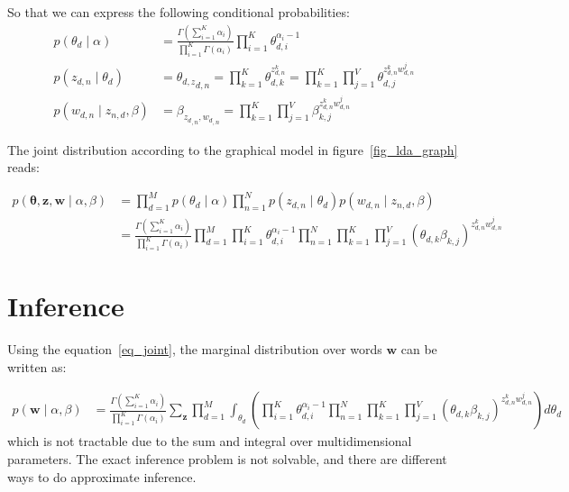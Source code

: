 \documentclass[12pt,a4paper,onecolumn]{article}
\begin{document}
\begin{multicols}{2}
	So that we can express the following conditional probabilities:
	\begin{align*}
		p(\theta_d \mid \alpha)        & = \frac{\Gamma\left(\sum_{i=1}^K \alpha_i\right)}{\prod_{i=1}^K\Gamma(\alpha_i)}\prod_{i=1}^K \theta_{d,i}^{\alpha_i -1}
		\\
		p(z_{d,n} \mid \theta_d)       & = {\theta_{d,z}}_{d,n} = \prod_{k=1}^K \theta_{d,k}^{z_{d,n}^k} =\prod_{k=1}^K \prod_{j=1}^V \theta_{d,j}^{z_{d,n}^k  w_{d,n}^j} \\
		p(w_{d,n} \mid z_{n,d}, \beta) & = \beta_{{z_d}_{,n},{w_d}_{,n}} = \prod_{k=1}^K \prod_{j=1}^V \beta_{k,j}^{z_{d,n}^k  w_{d,n}^j}
	\end{align*}



\end{multicols}

The joint distribution according to the graphical model in figure~\ref{fig_lda_graph} reads:

\begin{align}
	p(\bm{\theta}, \bm{z}, \bm{w} \mid \alpha, \beta) & = \prod_{d=1}^M p(\theta_d \mid \alpha) \prod_{n=1}^N p(z_{d,n} \mid \theta_d)p(w_{d,n} \mid z_{n,d}, \beta)                                                                                                                                 \\
	                                                  & = \frac{\Gamma\left(\sum_{i=1}^K \alpha_i\right)}{\prod_{i=1}^K\Gamma(\alpha_i)}\prod_{d=1}^M \prod_{i=1}^K \theta_{d,i}^{\alpha_i -1} \prod_{n=1}^N \prod_{k=1}^K \prod_{j=1}^V \left(\theta_{d,k}\beta_{k,j}\right)^{z_{d,n}^k  w_{d,n}^j}
	\label{eq_joint}
\end{align}

\section{Inference}

Using the equation~\eqref{eq_joint}, the marginal distribution over words \(\bm{w}\) can be written as:

\begin{align}
	p(\bm{w} \mid \alpha, \beta) & = \frac{\Gamma\left(\sum_{i=1}^K \alpha_i\right)}{\prod_{i=1}^K\Gamma(\alpha_i)}\sum_{\bm{z}}\prod_{d=1}^M\int_{\theta_d}\left( \prod_{i=1}^K \theta_{d,i}^{\alpha_i -1} \prod_{n=1}^N \prod_{k=1}^K \prod_{j=1}^V \left(\theta_{d,k}\beta_{k,j}\right)^{z_{d,n}^k  w_{d,n}^j}\right)d{\theta_d}
	\label{eq_intractable}
\end{align}
which is not tractable due to the sum and integral over multidimensional parameters. The exact inference problem is not solvable, and there are different ways to do approximate inference.
\end{document}
